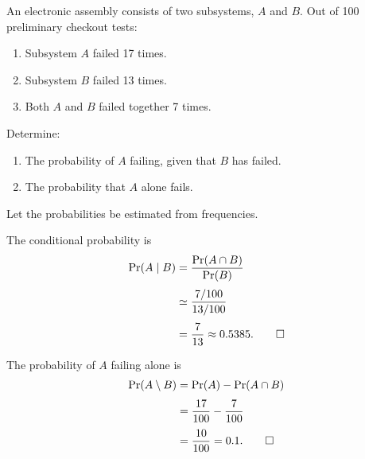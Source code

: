 \begin{hwkProblem}{8}{}

	An electronic assembly consists of two subsystems, \(A\) and \(B\). Out of 100 preliminary checkout tests:
	\begin{enumerate}
		\item Subsystem \(A\) failed 17 times.
		\item Subsystem \(B\) failed 13 times.
		\item Both \(A\) and \(B\) failed together 7 times.
	\end{enumerate}
	Determine:
	\begin{enumerate}
		\item The probability of \(A\) failing, given that \(B\) has failed.
		\item The probability that \(A\) alone fails.
	\end{enumerate}

	\hwkSol

	Let the probabilities be estimated from frequencies.

	\hwkPart

	The conditional probability is
	\begin{align*}
		\Pr(A\mid B) &= \frac{\Pr(A\cap B)}{\Pr(B)}\\[1mm]
			     &\simeq \frac{7/100}{13/100}\\[1mm]
			     &= \frac{7}{13}\approx 0.5385. \qed
	\end{align*}

	\hwkPart

	The probability of \(A\) failing alone is
	\begin{align*}
		\Pr(A\setminus B) &= \Pr(A)-\Pr(A\cap B)\\[1mm]
				  &= \frac{17}{100} - \frac{7}{100}\\[1mm]
				  &= \frac{10}{100} = 0.1. \qed
	\end{align*}

\end{hwkProblem}


